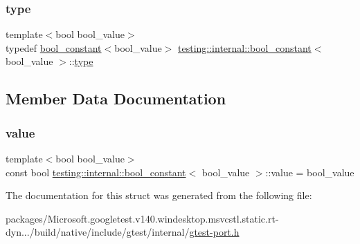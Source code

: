 \subsubsection{\texorpdfstring{type}{type}}
{\footnotesize\ttfamily template$<$bool bool\+\_\+value$>$ \\
typedef \mbox{\hyperlink{structtesting_1_1internal_1_1bool__constant}{bool\+\_\+constant}}$<$bool\+\_\+value$>$ \mbox{\hyperlink{structtesting_1_1internal_1_1bool__constant}{testing\+::internal\+::bool\+\_\+constant}}$<$ bool\+\_\+value $>$\+::\mbox{\hyperlink{structtesting_1_1internal_1_1bool__constant_aba6d09ecf7eecea6c93480f0d627a167}{type}}}



\subsection{Member Data Documentation}
\mbox{\label{structtesting_1_1internal_1_1bool__constant_a499fba6576296b04d99690a486424b32}} 
\subsubsection{\texorpdfstring{value}{value}}
{\footnotesize\ttfamily template$<$bool bool\+\_\+value$>$ \\
const bool \mbox{\hyperlink{structtesting_1_1internal_1_1bool__constant}{testing\+::internal\+::bool\+\_\+constant}}$<$ bool\+\_\+value $>$\+::value = bool\+\_\+value\hspace{0.3cm}{\ttfamily [static]}}



The documentation for this struct was generated from the following file\+:\begin{DoxyCompactItemize}
\item 
packages/\+Microsoft.\+googletest.\+v140.\+windesktop.\+msvcstl.\+static.\+rt-\/dyn.../build/native/include/gtest/internal/\mbox{\hyperlink{gtest-port_8h}{gtest-\/port.\+h}}\end{DoxyCompactItemize}
